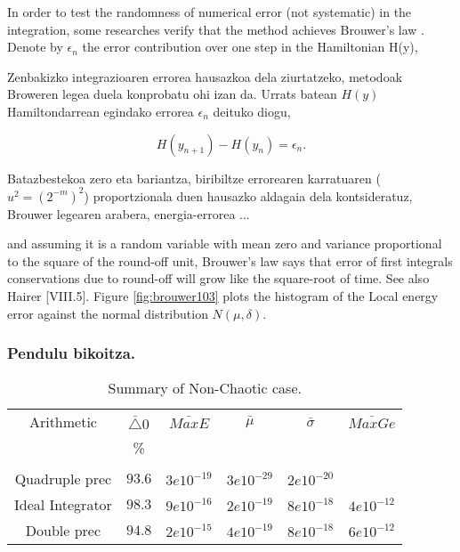 In order to test the randomness of numerical error (not systematic) in the integration, some researches verify that the method achieves Brouwer's law \cite{Brouwer1937}. Denote by $\epsilon_{n}$ the error contribution over one step in the Hamiltonian H(y),

Zenbakizko integrazioaren errorea hausazkoa dela ziurtatzeko, metodoak Broweren legea \cite{Brouwer1937} duela konprobatu ohi izan da. Urrats batean $H(y)$ Hamiltondarrean egindako errorea $\epsilon_{n}$ deituko diogu,

\begin{equation} \label{eq:18}
H(y_{n+1})-H(y_{n})=\epsilon_{n}.
\end{equation}

Batazbestekoa zero eta bariantza, biribiltze errorearen karratuaren ($u^2=(2^{-m})^2$) proportzionala duen hausazko aldagaia dela kontsideratuz, 
Brouwer legearen arabera, energia-errorea ...

and assuming it is a random variable with mean zero and variance proportional to the square of the round-off unit, Brouwer's law says that error of first integrals conservations due to round-off will grow like the square-root of time. See also Hairer \cite{Hairer2006}[VIII.5]. Figure \ref{fig:brouwer103} plots the histogram of the Local energy error against the normal distribution $N(\mu, \delta)$.

\subsubsection{Pendulu bikoitza.}

\begin{table} [h]
\caption{Summary of Non-Chaotic case.}
\label{tab:2}       %
\begin{tabular}{c|c c c c c} 
 Arithmetic   &  $\bar{\triangle}0$  &  $\bar{MaxE}$ & $\bar{\mu}$  & $\bar{\sigma}$   & $\bar{MaxGe}$  \\
                           &   \%            &       &          &            &         \\
 \hline
                           &                 &         &       &           &          \\
 Quadruple prec            &   $93.6$        &  $3e10^{-19}$  & $3e10^{-29}$  & $2e10^{-20}$  &      \\	    
 Ideal Integrator          &   $98.3$        &  $9e10^{-16}$  & $2e10^{-19}$  & $8e10^{-18}$ &  $4e10^{-12}$\\
 Double prec               &   $94.8$        &  $2e10^{-15}$  & $4e10^{-19}$  & $8e10^{-18}$ &  $6e10^{-12}$\\
\end{tabular}
\end{table}

